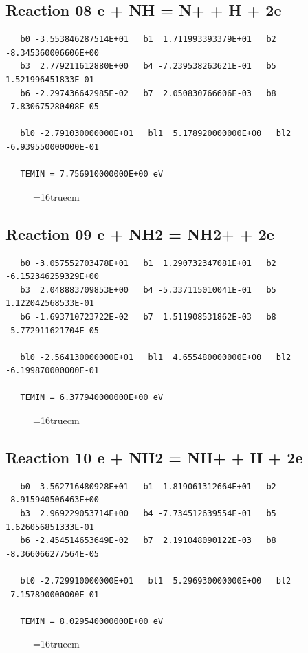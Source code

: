 \documentclass[12pt,dvipdfm]{article}
\begin{document}
\subsection{
Reaction 08 e + NH = N+ + H + 2e }
\begin{small}\begin{verbatim}
   b0 -3.553846287514E+01   b1  1.711993393379E+01   b2 -8.345360006606E+00
   b3  2.779211612880E+00   b4 -7.239538263621E-01   b5  1.521996451833E-01
   b6 -2.297436642985E-02   b7  2.050830766606E-03   b8 -7.830675280408E-05

   bl0 -2.791030000000E+01   bl1  5.178920000000E+00   bl2 -6.939550000000E-01

   TEMIN = 7.756910000000E+00 eV
\end{verbatim}\end{small}
\begin{figure}[h!] \label{n2rates}
\epsfxsize=16truecm
\end{figure}
\newpage

\subsection{
Reaction 09 e + NH2 = NH2+ + 2e }
\begin{small}\begin{verbatim}
   b0 -3.057552703478E+01   b1  1.290732347081E+01   b2 -6.152346259329E+00
   b3  2.048883709853E+00   b4 -5.337115010041E-01   b5  1.122042568533E-01
   b6 -1.693710723722E-02   b7  1.511908531862E-03   b8 -5.772911621704E-05

   bl0 -2.564130000000E+01   bl1  4.655480000000E+00   bl2 -6.199870000000E-01

   TEMIN = 6.377940000000E+00 eV
\end{verbatim}\end{small}
\begin{figure}[h!] \label{n2rates}
\epsfxsize=16truecm
\end{figure}
\newpage

\subsection{
Reaction 10 e + NH2 = NH+ + H + 2e }
\begin{small}\begin{verbatim}
   b0 -3.562716480928E+01   b1  1.819061312664E+01   b2 -8.915940506463E+00
   b3  2.969229053714E+00   b4 -7.734512639554E-01   b5  1.626056851333E-01
   b6 -2.454514653649E-02   b7  2.191048090122E-03   b8 -8.366066277564E-05

   bl0 -2.729910000000E+01   bl1  5.296930000000E+00   bl2 -7.157890000000E-01

   TEMIN = 8.029540000000E+00 eV
\end{verbatim}\end{small}
\begin{figure}[h!] \label{n2rates}
\epsfxsize=16truecm
\end{figure}
\newpage
\end{document}
